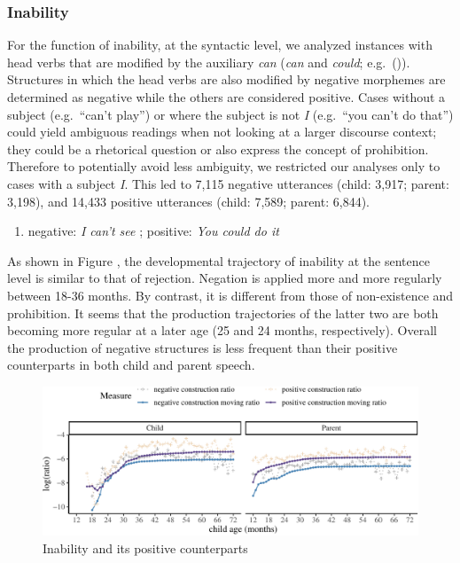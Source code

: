 \documentclass[
  english,
  man,floatsintext]{apa6}
\providecommand{\tightlist}{%
  \setlength{\itemsep}{0pt}\setlength{\parskip}{0pt}}
\begin{document}
\clearpage

\hypertarget{inability}{%
\subsubsection{Inability}\label{inability}}

For the function of inability, at the syntactic level, we analyzed instances with head verbs that are modified by the auxiliary \emph{can} (\emph{can} and \emph{could}; e.g.~()). Structures in which the head verbs are also modified by negative morphemes are determined as negative while the others are considered positive. Cases without a subject (e.g.~``can't play'') or where the subject is not \emph{I} (e.g.~``you can't do that'') could yield ambiguous readings when not looking at a larger discourse context; they could be a rhetorical question or also express the concept of prohibition. Therefore to potentially avoid less ambiguity, we restricted our analyses only to cases with a subject \emph{I}. This led to 7,115 negative utterances (child: 3,917; parent: 3,198), and 14,433 positive utterances (child: 7,589; parent: 6,844).

\begin{enumerate}
\def\labelenumi{(\arabic{enumi})}
\setcounter{enumi}{7}
\tightlist
\item
  negative: \emph{I can't see} ; positive: \emph{You could do it}
\end{enumerate}

As shown in Figure , the developmental trajectory of inability at the sentence level is similar to that of rejection. Negation is applied more and more regularly between 18-36 months. By contrast, it is different from those of non-existence and prohibition. It seems that the production trajectories of the latter two are both becoming more regular at a later age (25 and 24 months, respectively). Overall the production of negative structures is less frequent than their positive counterparts in both child and parent speech.

\begin{figure}[H]

{\centering \includegraphics{neg_construction_article_files/figure-latex/inability-1} 

}

\caption{Inability and its positive counterparts}\label{fig:inability}
\end{figure}
\end{document}
